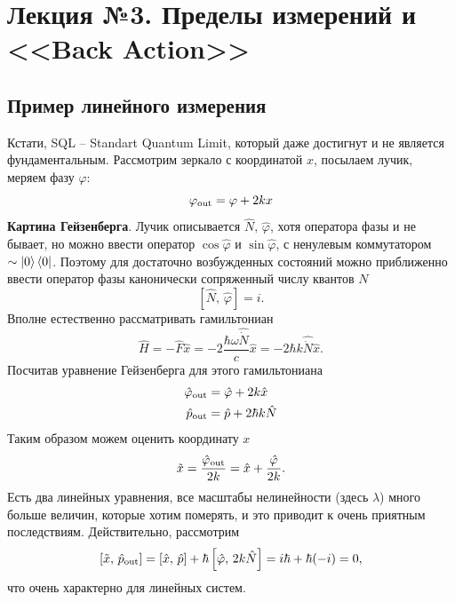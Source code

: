 
\section{Лекция №3. Пределы измерений и <<Back Action>>}




\subsection*{Пример линейного измерения}


Кстати, SQL -- Standart Quantum Limit, который даже достигнут и не является фундаментальным. Рассмотрим зеркало с координатой $x$, посылаем лучик, меряем фазу $\varphi$:
\begin{equation*}
	\varphi_{\textnormal{out}} = \varphi + 2 k x
\end{equation*}
\textbf{Картина Гейзенберга}. Лучик описывается $\hat{N},\, \hat{\varphi}$, хотя оператора фазы и не бывает, но можно ввести оператор $\cos \hat{\varphi}$ и $\sin \hat{\varphi}$, с ненулевым коммутатором $\sim  \left| 0 \right\rangle \left\langle 0 \right| $. Поэтому для достаточно возбужденных состояний можно приближенно ввести оператор фазы канонически сопряженный числу квантов $N$
\begin{equation*}
	\left[\hat{N},\, \hat{\varphi}\right] = i.
\end{equation*}
Вполне естественно рассматривать гамильтониан
\begin{equation*}
	\hat{H} = - \hat{F} \hat{x} = - 2 \frac{\hbar \omega \hat{\dot{N}}}{c} \hat{x} = - 2 \hbar k \hat{\dot{N}} \hat{x}.
\end{equation*}
Посчитав уравнение Гейзенберга для этого гамильтониана
\begin{align*}
	\hat{\varphi}_{\textnormal{out}} &= \hat{\varphi} + 2 k \hat{x} \\
	\hat{p}_{\textnormal{out}} &= \hat{p} + 2 \hbar k \hat{N}
\end{align*}
Таким образом можем оценить координату $x$
\begin{equation*}
	\tilde{x} = \frac{\hat{\varphi}_{\textnormal{out}}}{2k} = \hat{x} + \frac{\hat{\varphi}}{2k}.
\end{equation*}
Есть два линейных уравнения, все масштабы нелинейности (здесь $\lambda$) много больше величин, которые хотим померять, и это приводит к очень приятным последствиям. Действительно, рассмотрим
\begin{equation*}
	\left[\tilde{x},\, \hat{p}_{\textnormal{out}} \right] = \left[\hat{x},\, \hat{p}\right] + \hbar \left[\hat{\varphi},\, 2k \hat{N}\right] = i \hbar + \hbar (-i) = 0,
\end{equation*}
что очень характерно для линейных систем.

